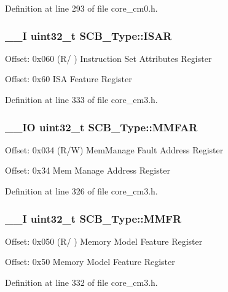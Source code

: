 Definition at line 293 of file core\-\_\-cm0.\-h.

\hypertarget{struct_s_c_b___type_a84715ecbe885efa4841d594e7409ccae}{
\subsubsection[{I\-S\-A\-R}]{\setlength{\rightskip}{0pt plus 5cm}\-\_\-\-\_\-\-I {\bf uint32\-\_\-t} S\-C\-B\-\_\-\-Type\-::\-I\-S\-A\-R}}\label{struct_s_c_b___type_a84715ecbe885efa4841d594e7409ccae}
Offset\-: 0x060 (R/ ) Instruction Set Attributes Register

Offset\-: 0x60 I\-S\-A Feature Register 

Definition at line 333 of file core\-\_\-cm3.\-h.

\hypertarget{struct_s_c_b___type_ac49b24b3f222508464f111772f2c44dd}{
\subsubsection[{M\-M\-F\-A\-R}]{\setlength{\rightskip}{0pt plus 5cm}\-\_\-\-\_\-\-I\-O {\bf uint32\-\_\-t} S\-C\-B\-\_\-\-Type\-::\-M\-M\-F\-A\-R}}\label{struct_s_c_b___type_ac49b24b3f222508464f111772f2c44dd}
Offset\-: 0x034 (R/\-W) Mem\-Manage Fault Address Register

Offset\-: 0x34 Mem Manage Address Register 

Definition at line 326 of file core\-\_\-cm3.\-h.

\hypertarget{struct_s_c_b___type_a40b4fec8c296cba02baec983378cbcfd}{
\subsubsection[{M\-M\-F\-R}]{\setlength{\rightskip}{0pt plus 5cm}\-\_\-\-\_\-\-I {\bf uint32\-\_\-t} S\-C\-B\-\_\-\-Type\-::\-M\-M\-F\-R}}\label{struct_s_c_b___type_a40b4fec8c296cba02baec983378cbcfd}
Offset\-: 0x050 (R/ ) Memory Model Feature Register

Offset\-: 0x50 Memory Model Feature Register 

Definition at line 332 of file core\-\_\-cm3.\-h.

